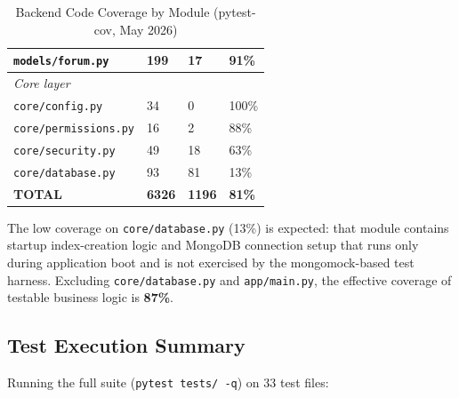 \documentclass[11pt,a4paper]{report}
\begin{document}
\begin{table}[h]
\begin{tabularx}{\textwidth}{|l|X|X|X|}
        \hline
        \texttt{models/forum.py}                          & 199                 & 17              & 91\%              \\
        \hline
        \multicolumn{4}{|l|}{\textit{Core layer}}                                                                     \\
        \hline
        \texttt{core/config.py}                           & 34                  & 0               & 100\%             \\
        \hline
        \texttt{core/permissions.py}                      & 16                  & 2               & 88\%              \\
        \hline
        \texttt{core/security.py}                         & 49                  & 18              & 63\%              \\
        \hline
        \texttt{core/database.py}                         & 93                  & 81              & 13\%              \\
        \hline
        \hline
        \textbf{TOTAL}                                    & \textbf{6326}       & \textbf{1196}   & \textbf{81\%}     \\
        \hline
    \end{tabularx}
    \caption{Backend Code Coverage by Module (pytest-cov, May 2026)}
\end{table}

\noindent The low coverage on \texttt{core/database.py} (13\%) is expected: that module contains startup index-creation logic and MongoDB connection setup that runs only during application boot and is not exercised by the mongomock-based test harness. Excluding \texttt{core/database.py} and \texttt{app/main.py}, the effective coverage of testable business logic is \textbf{87\%}.

\subsection{Test Execution Summary}

Running the full suite (\texttt{pytest tests/ -q}) on 33 test files:
\end{document}
